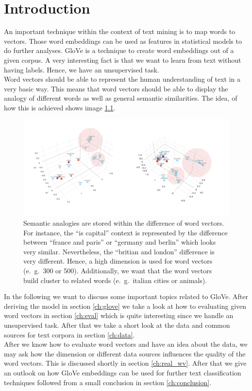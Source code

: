 \chapter{Introduction}

An important technique within the context of text mining is to map words to vectors. Those 
word embeddings can be used as features in statistical models to do further analyses. 
GloVe is a technique to create word embeddings out of a given corpus. A very interesting 
fact is that we want to learn from text without having labels. Hence, we have an unsupervised 
task. \\

Word vectors should be able to represent the human understanding of text in a very 
basic way. This means that word vectors should be able to display the analogy of different 
words as well as general semantic similarities. The idea, of how this is achieved shows image \ref{fig:wv}. 

\begin{figure}[!h]
\centering
\includegraphics[scale=0.7]{images/wv_glove.png} 
\caption[Word vectors in 3 dimensions trained by GloVe.]{Semantic analogies are stored within 
         the difference of word vectors. For instance, the \enquote{is capital} context is
         represented by the difference between \enquote{france and paris} or 
         \enquote{germany and berlin} which looks very similar. Nevertheless, 
         the \enquote{britian and london} difference is very different. Hence, a high
         dimension is used for word vectors (e.~g.~300 or 500). Additionally, we want that 
         the word vectors build cluster to related words (e.~g.~italian cities or animals).}
\label{fig:wv}
\end{figure}

In the following we want to discuss some important topics related to GloVe. After 
deriving the model in section \ref{ch:glove} we take a look at how 
to evaluating given word vectors in section \ref{ch:eval} which is quite interesting 
since we handle an unsupervised task. After that we take a short look at the data 
and common sources for text corpora in section \ref{ch:data}. \\

After we know how to evaluate word vectors and have an idea about the data, 
we may ask how the dimension or different data 
sources influences the quality of the word vectors. This is discussed shortly in section
\ref{ch:real_wv}. After that we give an outlook on how GloVe embeddings can be used for
further text classification techniques followed from a small conclusion in section
\ref{ch:conclusion}.
